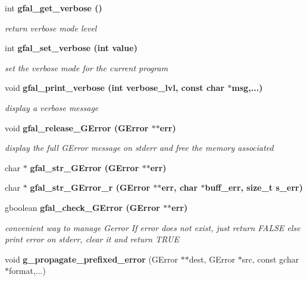 \begin{CompactItemize}
\item 
int \bf{gfal\_\-get\_\-verbose} ()\label{gfal__common__errverbose_8c_135b3fdd775aa7215e2ab4de1eea495f}

\begin{CompactList}\small\item\em return verbose mode level \item\end{CompactList}\item 
int \bf{gfal\_\-set\_\-verbose} (int value)\label{gfal__common__errverbose_8c_df0f68db7d70d7ce1f530c7a51f9cc83}

\begin{CompactList}\small\item\em set the verbose mode for the current program \item\end{CompactList}\item 
void \bf{gfal\_\-print\_\-verbose} (int verbose\_\-lvl, const char $\ast$msg,...)
\begin{CompactList}\small\item\em display a verbose message \item\end{CompactList}\item 
void \bf{gfal\_\-release\_\-GError} (GError $\ast$$\ast$err)\label{gfal__common__errverbose_8c_1441ea4b8176eb0cf3099009b950a3e9}

\begin{CompactList}\small\item\em display the full GError message on stderr and free the memory associated \item\end{CompactList}\item 
char $\ast$ \bf{gfal\_\-str\_\-GError} (GError $\ast$$\ast$err)
\item 
char $\ast$ \bf{gfal\_\-str\_\-GError\_\-r} (GError $\ast$$\ast$err, char $\ast$buff\_\-err, size\_\-t s\_\-err)
\item 
gboolean \bf{gfal\_\-check\_\-GError} (GError $\ast$$\ast$err)\label{gfal__common__errverbose_8c_9167aee5bda42b71a982f863e88f7bfd}

\begin{CompactList}\small\item\em convenient way to manage Gerror If error does not exist, just return FALSE else print error on stderr, clear it and return TRUE \item\end{CompactList}\item 
void \textbf{g\_\-propagate\_\-prefixed\_\-error} (GError $\ast$$\ast$dest, GError $\ast$src, const gchar $\ast$format,...)\label{gfal__common__errverbose_8c_ba441719ee1fd49a708add03c0eea22f}


\end{CompactItemize}
